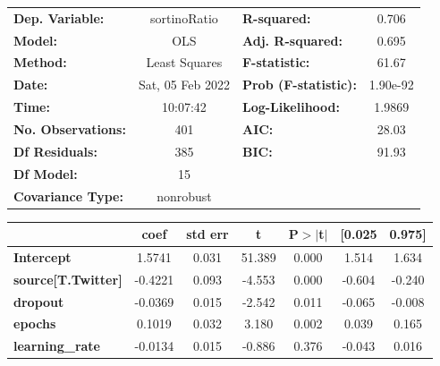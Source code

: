 \begin{center}
\begin{tabular}{lclc}
\toprule
\textbf{Dep. Variable:}              &   sortinoRatio   & \textbf{  R-squared:         } &     0.706   \\
\textbf{Model:}                      &       OLS        & \textbf{  Adj. R-squared:    } &     0.695   \\
\textbf{Method:}                     &  Least Squares   & \textbf{  F-statistic:       } &     61.67   \\
\textbf{Date:}                       & Sat, 05 Feb 2022 & \textbf{  Prob (F-statistic):} &  1.90e-92   \\
\textbf{Time:}                       &     10:07:42     & \textbf{  Log-Likelihood:    } &    1.9869   \\
\textbf{No. Observations:}           &         401      & \textbf{  AIC:               } &     28.03   \\
\textbf{Df Residuals:}               &         385      & \textbf{  BIC:               } &     91.93   \\
\textbf{Df Model:}                   &          15      & \textbf{                     } &             \\
\textbf{Covariance Type:}            &    nonrobust     & \textbf{                     } &             \\
\bottomrule
\end{tabular}
\begin{tabular}{lcccccc}
                                     & \textbf{coef} & \textbf{std err} & \textbf{t} & \textbf{P$> |$t$|$} & \textbf{[0.025} & \textbf{0.975]}  \\
\midrule
\textbf{Intercept}                   &       1.5741  &        0.031     &    51.389  &         0.000        &        1.514    &        1.634     \\
\textbf{source[T.Twitter]}           &      -0.4221  &        0.093     &    -4.553  &         0.000        &       -0.604    &       -0.240     \\
\textbf{dropout}                     &      -0.0369  &        0.015     &    -2.542  &         0.011        &       -0.065    &       -0.008     \\
\textbf{epochs}                      &       0.1019  &        0.032     &     3.180  &         0.002        &        0.039    &        0.165     \\
\textbf{learning\_rate}              &      -0.0134  &        0.015     &    -0.886  &         0.376        &       -0.043    &        0.016     \\

\end{tabular}
\end{center}
